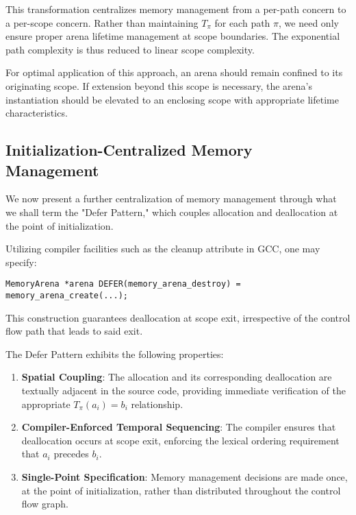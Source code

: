 This transformation centralizes memory management from a per-path concern to a per-scope concern. Rather than maintaining $T_{\pi}$ for each path $\pi$, we need only ensure proper arena lifetime management at scope boundaries. The exponential path complexity is thus reduced to linear scope complexity.

For optimal application of this approach, an arena should remain confined to its originating scope. If extension beyond this scope is necessary, the arena's instantiation should be elevated to an enclosing scope with appropriate lifetime characteristics.

\subsection{Initialization-Centralized Memory Management}
\label{subsec:Initialization-Centralized-Memory-Management}

We now present a further centralization of memory management through what we shall term the "Defer Pattern," which couples allocation and deallocation at the point of initialization.

Utilizing compiler facilities such as the cleanup attribute in GCC, one may specify:

\begin{verbatim}
MemoryArena *arena DEFER(memory_arena_destroy) = memory_arena_create(...);
\end{verbatim}

This construction guarantees deallocation at scope exit, irrespective of the control flow path that leads to said exit.

The Defer Pattern exhibits the following properties:

\begin{enumerate}
	\item \textbf{Spatial Coupling}: The allocation and its corresponding deallocation are textually adjacent in the source code, providing immediate verification of the appropriate $T_{\pi}(a_i) = b_i$ relationship.

	\item \textbf{Compiler-Enforced Temporal Sequencing}: The compiler ensures that deallocation occurs at scope exit, enforcing the lexical ordering requirement that $a_i$ precedes $b_i$.

	\item \textbf{Single-Point Specification}: Memory management decisions are made once, at the point of initialization, rather than distributed throughout the control flow graph.
\end{enumerate}

